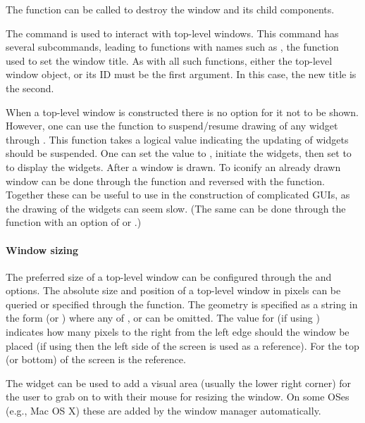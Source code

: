 The  function can be called to destroy the window
and its child components.

The \TK\/ command  is used to interact with top-level
windows. This command has several subcommands, leading to 
functions with names such as , the function
used to set the window title. As with all such functions, either the
top-level window object, or its ID must be the first argument. In this
case, the new title is the second.

When a top-level window is constructed there is no option for it not
to be shown.  However, one can use the 
function to suspend/resume drawing of any widget through \TK. This
function takes a logical value indicating the updating of widgets
should be suspended. One can set the value to , initiate
the widgets, then set to  to display the widgets.  After a
window is drawn. To iconify an already drawn window can be done
through the  function and reversed with the
 function. Together these can be useful to
use in the construction of complicated GUIs, as the drawing of the
widgets can seem slow. (The same can be done through the
 function with an option of  or
.)
 
\paragraph{Window sizing}
The preferred size of a top-level window can be configured through the
 and  options. The absolute size and position
of a top-level window in pixels can be queried or specified through
the  function. The geometry is specified as a
string in the form  (or \code{-}) where any of
\code{=},  or  can be omitted. The value for
 (if using \code{+}) indicates how many pixels to the right
from the left edge should the window be placed (if using \code{-} then
the left side of the screen is used as a reference). For  the
top (or bottom) of the screen is the reference.

The  widget can be used to add a visual area
(usually the lower right corner) for the user to grab on to with their
mouse for resizing the window. On some OSes (e.g., Mac OS X) these are
added by the window manager automatically.

